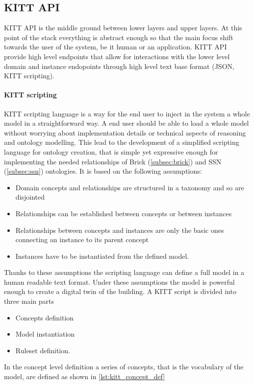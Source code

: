 \subsection{KITT API}
KITT API is the middle ground between lower layers and upper layers. At this point of the stack everything is abstract enough so that the main focus shift towards the user of the system, be it human or an application. KITT API provide high level endpoints that allow for interactions with the lower level domain and instance endopoints through high level text base format (JSON, KITT scripting).

\paragraph{KITT scripting}
KITT scripting language is a way for the end user to inject in the system a whole model in a straightforward way. A end user should be able to load a whole model without worrying about implementation details or technical aspects of reasoning and ontology modelling. This lead to the development of a simplified scripting language for ontology creation, that is simple yet expressive enough for implementing the needed relationships of Brick (\autoref{subsec:brick}) and SSN (\autoref{subsec:ssn}) ontologies. It is based on the following assumptions:
\begin{itemize}
  \item Domain concepts and relationships are structured in a taxonomy and so are disjointed
  \item Relationships can be established between concepts or between instances
  \item Relationships between concepts and instances are only the basic ones connecting an instance to its parent concept
  \item Instances have to be instantiated from the defined model.
\end{itemize}
Thanks to these assumptions the scripting language can define a full model in a human readable text format. Under these assumptions the model is powerful enough to create a digital twin of the building. A KITT script is divided into three main parts
\begin{itemize}
  \item Concepts definition
  \item Model instantiation
  \item Ruleset definition.
\end{itemize}
In the concept level definition a series of concepts, that is the vocabulary of the model, are defined as shown in \autoref{lst:kitt_concept_def}
